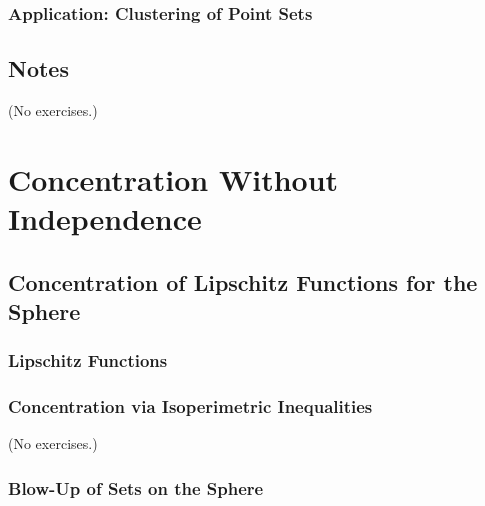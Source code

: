 \documentclass{report}
\theoremstyle{definition}
\newenvironment{exercise}[1]{
  \renewcommand\theexerciseimpl{#1}
  \exerciseimpl
}{\endexerciseimpl}
\begin{document}
\begin{exercise}{4.7.1}
\end{exercise}

\subsection{Application: Clustering of Point Sets}

\begin{exercise}{4.7.6}
\end{exercise}

\section{Notes}

(No exercises.)


\chapter{Concentration Without Independence}

\section{Concentration of Lipschitz Functions for the Sphere}

\subsection{Lipschitz Functions}

\begin{exercise}{5.1.2}
\end{exercise}

\begin{exercise}{5.1.3}
\end{exercise}

\subsection{Concentration via Isoperimetric Inequalities}

(No exercises.)

\subsection{Blow-Up of Sets on the Sphere}

\begin{exercise}{5.1.8}
\end{exercise}
\end{document}
